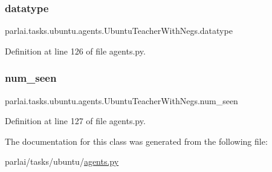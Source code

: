 \subsubsection{\texorpdfstring{datatype}{datatype}}
{\footnotesize\ttfamily parlai.\+tasks.\+ubuntu.\+agents.\+Ubuntu\+Teacher\+With\+Negs.\+datatype}



Definition at line 126 of file agents.\+py.

\mbox{\label{classparlai_1_1tasks_1_1ubuntu_1_1agents_1_1UbuntuTeacherWithNegs_a66c8920874a95611d27a7d5b21c1c128}} 
\subsubsection{\texorpdfstring{num\+\_\+seen}{num\_seen}}
{\footnotesize\ttfamily parlai.\+tasks.\+ubuntu.\+agents.\+Ubuntu\+Teacher\+With\+Negs.\+num\+\_\+seen}



Definition at line 127 of file agents.\+py.



The documentation for this class was generated from the following file\+:\begin{DoxyCompactItemize}
\item 
parlai/tasks/ubuntu/\hyperlink{parlai_2tasks_2ubuntu_2agents_8py}{agents.\+py}\end{DoxyCompactItemize}
